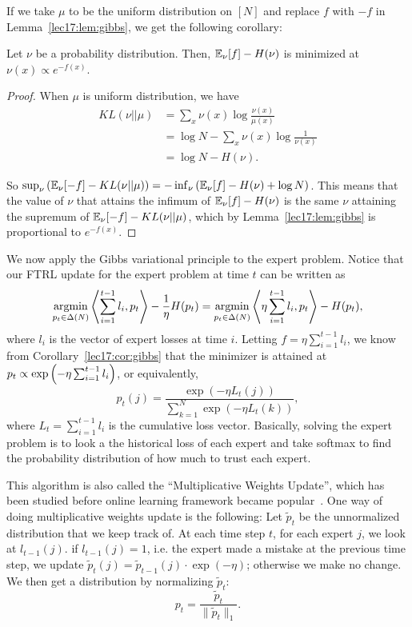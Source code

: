 If we take $\mu$ to be the uniform distribution on $[N]$ and replace $f$ with $-f$ in Lemma~\ref{lec17:lem:gibbs}, we get the following corollary:

\begin{corollary}\label{lec17:cor:gibbs}
	Let $\nu$ be a probability distribution. Then, 
	$\operatorname*{\mathbb{E}}_\nu[f] - H(\nu)$ is minimized at $\nu(x) \propto e^{-f(x)}$.
\end{corollary} 

\begin{proof}
When $\mu$ is uniform distribution, we have
\begin{align}
KL(\nu||\mu) &= \sum_x \nu(x) \log \frac{\nu(x)}{\mu(x)} \\
&= \log N - \sum_x \nu(x) \log \frac{1}{\nu(x)} \\
&= \log N - H(\nu).
\end{align}

So $\sup_\nu \left(\operatorname*{\mathbb{E}}_\nu[-f] - KL(\nu||\mu)\right) = -\inf_\nu \left(\operatorname*{\mathbb{E}}_\nu[f] - H(\nu) + \log N\right)$. This means that the value of $\nu$ that attains the infimum of $\operatorname*{\mathbb{E}}_\nu[f] - H(\nu)$ is the same $\nu$ attaining the supremum of $\operatorname*{\mathbb{E}}_\nu[-f] - KL(\nu||\mu)$, which by Lemma~\ref{lec17:lem:gibbs} is proportional to $e^{-f(x)}$.
\end{proof}

We now apply the Gibbs variational principle to the expert problem. Notice that our FTRL update for the expert problem at time $t$ can be written as
\begin{equation}
\operatorname*{\textup{argmin}}_{p_t \in \Delta(N)} \left\langle \sum_{i=1}^{t-1}l_i, p_t \right\rangle - \frac{1}{\eta}H(p_t) = \operatorname*{\textup{argmin}}_{p_t \in \Delta(N)} \left\langle\eta \sum_{i=1}^{t-1}l_i, p_t \right\rangle - H(p_t),
\end{equation}
where $l_i$ is the vector of expert losses at time $i$. Letting $f = \eta \sum_{i=1}^{t-1} l_i$, we know from Corollary~\ref{lec17:cor:gibbs} that the minimizer is attained at $p_t \propto \exp \left(-\eta \sum_{i=1}^{t-1}l_i \right)$, or equivalently,  
\begin{equation}
p_t(j) = \frac{\exp(-\eta L_t(j))}{\sum_{k=1}^N \exp(-\eta L_t(k))},
\end{equation}
where $L_t = \sum_{i=1}^{t-1}l_i$ is the cumulative loss vector. Basically, solving the expert problem is to look a the historical loss of each expert and take softmax to find the probability distribution of how much to trust each expert. 

This algorithm is also called the ``Multiplicative Weights Update'', which has been studied before online learning framework became popular~\cite{arora2005fast, freund1997decision, littlestone1994weighted}. One way of doing multiplicative weights update is the following: Let $\tilde{p}_t$ be the unnormalized distribution that we keep track of. At each time step $t$, for each expert $j$, we look at $l_{t-1}(j)$. if $l_{t-1}(j)=1$, i.e. the expert made a mistake at the previous time step, we update $\tilde{p}_t(j) = \tilde{p}_{t-1}(j) \cdot \exp(-\eta)$; otherwise we make no change. We then get a distribution by normalizing $\tilde{p}_t$:
\begin{equation}
p_t = \frac{\tilde{p}_t}{\|\tilde{p}_t\|_1}.
\end{equation}

